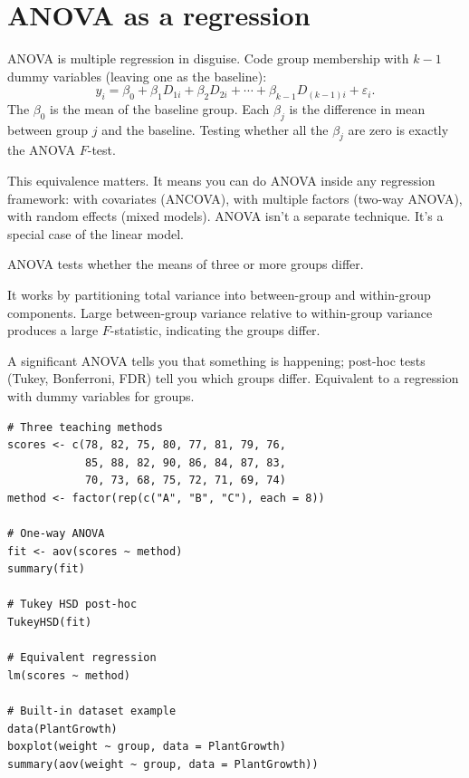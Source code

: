 \section{ANOVA as a regression}

ANOVA is multiple regression in disguise. Code group membership with $k - 1$ dummy variables (leaving one as the baseline):
\[
  y_i = \beta_0 + \beta_1 D_{1i} + \beta_2 D_{2i} + \cdots + \beta_{k-1} D_{(k-1)i} + \varepsilon_i.
\]
The $\beta_0$ is the mean of the baseline group. Each $\beta_j$ is the difference in mean between group $j$ and the baseline. Testing whether all the $\beta_j$ are zero is exactly the ANOVA $F$-test.

This equivalence matters. It means you can do ANOVA inside any regression framework: with covariates (ANCOVA), with multiple factors (two-way ANOVA), with random effects (mixed models). ANOVA isn't a separate technique. It's a special case of the linear model.

\begin{keyinsight}
ANOVA tests whether the means of three or more groups differ.

It works by partitioning total variance into between-group and within-group components. Large between-group variance relative to within-group variance produces a large $F$-statistic, indicating the groups differ.

A significant ANOVA tells you that something is happening; post-hoc tests (Tukey, Bonferroni, FDR) tell you which groups differ. Equivalent to a regression with dummy variables for groups.
\end{keyinsight}

\begin{codelab}
\begin{lstlisting}[language=Rlang]
# Three teaching methods
scores <- c(78, 82, 75, 80, 77, 81, 79, 76,
            85, 88, 82, 90, 86, 84, 87, 83,
            70, 73, 68, 75, 72, 71, 69, 74)
method <- factor(rep(c("A", "B", "C"), each = 8))

# One-way ANOVA
fit <- aov(scores ~ method)
summary(fit)

# Tukey HSD post-hoc
TukeyHSD(fit)

# Equivalent regression
lm(scores ~ method)

# Built-in dataset example
data(PlantGrowth)
boxplot(weight ~ group, data = PlantGrowth)
summary(aov(weight ~ group, data = PlantGrowth))
\end{lstlisting}
\end{codelab}

